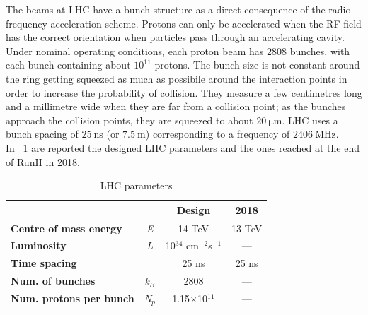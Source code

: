 The beams at LHC have a bunch structure as a direct consequence of the radio frequency acceleration scheme. Protons can only be accelerated when the RF field has the correct orientation when particles pass through an accelerating cavity. Under nominal operating conditions, each proton beam has 2808 bunches, with each bunch containing about $10^{11}$ protons. The bunch size is not constant around the ring getting squeezed as much as possibile around the interaction points in order to increase the probability of collision. They measure a few centimetres long and a millimetre wide when they are far from a collision point; as the bunches approach  the collision points, they are squeezed to about $20~\mathrm{\mu m}$. LHC uses a bunch spacing of $25~\mathrm{ns}$ (or $7.5~\mathrm{m}$) corresponding to a frequency of $2406~\mathrm{MHz}$. \\
In \tablename~\ref{LHC_parameteres} are reported the designed LHC parameters and the ones reached at the end of RunII in 2018.
\begin{table}[htbp]	
	\begin{center}
		\begin{tabular}{p{6cm}*{3}{c}}
			\hline   &  & Design & 2018  \\
			\hline
			\hline
			\bfseries Centre of mass energy & \emph{E} & 14 TeV & 13 TeV \\
			\hline
			\bfseries Luminosity & \emph{L} & 10$^{34}$ cm$^{-2}$s$^{-1}$ & --- \\
			\hline
			\bfseries Time spacing &  & 25 ns & 25 ns\\
			\hline
			\bfseries Num. of bunches& \emph{k$_{B}$} & 2808 & ---\\
			\hline
			\bfseries Num. protons per bunch & \emph{N$_{p}$} & 1.15$\times$10$^{11}$ & ---\\
			\hline
			\hline
		\end{tabular}
	\end{center}
	\caption{LHC parameters}
	\label{LHC_parameteres}
\end{table}


